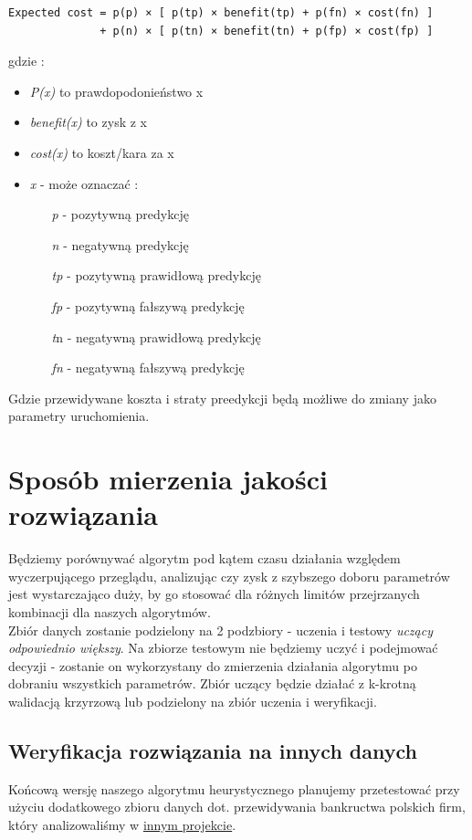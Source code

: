 \documentclass[11pt]{article}
\begin{document}
\begin{verbatim}
Expected cost = p(p) × [ p(tp) × benefit(tp) + p(fn) × cost(fn) ]
              + p(n) × [ p(tn) × benefit(tn) + p(fp) × cost(fp) ]
\end{verbatim}           
gdzie :
\begin{itemize}
	\item \textsl{P(x)} to prawdopodonieństwo x
	\item \textsl{benefit(x)} to zysk z x
	\item \textsl{cost(x)} to koszt/kara za x
	\item \textsl{x} - może oznaczać :
		\begin{itemize}
			\item[\textit{p} -] pozytywną predykcję
			\item[\textit{n} -] negatywną predykcję
			\item[\textit{tp} -] pozytywną prawidłową predykcję
			\item[\textit{fp} -] pozytywną fałszywą predykcję
			\item[\textit{t}n -] negatywną prawidłową predykcję
			\item[\textit{fn} -] negatywną fałszywą predykcję
		\end{itemize}
\end{itemize}
Gdzie przewidywane koszta i straty preedykcji będą możliwe do zmiany jako parametry uruchomienia.

\section{Sposób mierzenia jakości rozwiązania}
Będziemy porównywać algorytm pod kątem czasu działania względem wyczerpującego przeglądu, analizując czy zysk z szybszego doboru parametrów jest wystarczająco duży, by go stosować dla różnych limitów przejrzanych kombinacji dla naszych algorytmów.
\\
Zbiór danych zostanie podzielony na 2 podzbiory - uczenia i testowy \textsl{uczący odpowiednio większy}. Na zbiorze testowym nie będziemy uczyć i podejmować decyzji - zostanie on wykorzystany do zmierzenia działania algorytmu po dobraniu wszystkich parametrów. Zbiór uczący będzie działać z k-krotną walidacją krzyrzową lub podzielony na zbiór uczenia i weryfikacji.

\subsection{Weryfikacja rozwiązania na innych danych}
Końcową wersję naszego algorytmu heurystycznego planujemy przetestować przy użyciu dodatkowego zbioru danych dot. przewidywania bankructwa polskich firm, który analizowaliśmy w \href{https://github.com/przestaw/Data_Mining_Bancrupcy}{innym projekcie}.
\end{document}
